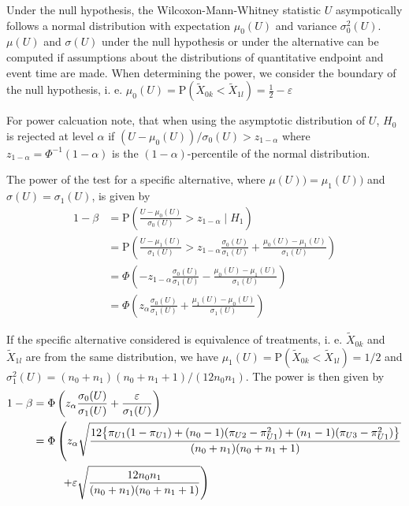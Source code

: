 \documentclass[bimj,fleqn]{w-art}\usepackage[]{graphicx}\usepackage[]{color}
\theoremstyle{plain}
\theoremstyle{definition}
\begin{document}
  Under the null hypothesis, the Wilcoxon-Mann-Whitney statistic $U$
  asympotically follows a normal distribution with expectation $\mu_0(U)$ and
  variance $\sigma^2_0(U)$. $\mu(U)$ and $\sigma(U)$ under the null hypothesis
  or under the alternative can be computed if assumptions about the
  distributions of quantitative endpoint and event time are made. When
  determining the power, we consider the boundary of the null hypothesis, i. e.
  $\mu_0(U) = \text{P}(\widetilde{X}_{0k} < \widetilde{X}_{1l})
          = \frac{1}{2} - \varepsilon$

  For power calcuation note, that when using the asymptotic distribution of $U$, $H_0$ is rejected at
  level $\alpha$ if $(U - \mu_0(U)) / \sigma_0(U) > z_{1 - \alpha}$ where
  $z_{1-\alpha} = \Phi^{-1}({1-\alpha})$ is the $(1 - \alpha)$-percentile of the
  normal distribution.

  The power of the test for a specific alternative, where $\mu(U)) = \mu_1(U))$
  and $\sigma(U) = \sigma_1(U)$, is given by
  \begin{align*}
    1 - \beta &= \text{P} \left(\frac{U - \mu_0(U)}{\sigma_0(U)}  >
                                   z_{1-\alpha} \mid H_1 \right) \\
              &= \text{P} \left(\frac{U - \mu_1(U)}{\sigma_1(U)}  >
                                   z_{1-\alpha}\frac{\sigma_0(U)}{\sigma_1(U)} +
                                   \frac{\mu_0(U) - \mu_1(U)}{\sigma_1(U)} \right) \\
              &= \Phi\left(- z_{1-\alpha}\frac{\sigma_0(U)}{\sigma_1(U)} -
                              \frac{\mu_0(U) - \mu_1(U)}{\sigma_1(U)} \right) \\
              &= \Phi\left(z_{\alpha}\frac{\sigma_0(U)}{\sigma_1(U)} +
                              \frac{\mu_1(U) - \mu_0(U)}{\sigma_1(U)} \right)
  \end{align*}

  If the specific alternative considered is equivalence of treatments, i. e.
  $\widetilde{X}_{0k}$ and $\widetilde{X}_{1l}$ are from the same distribution,
  we have $\mu_1(U) = \text{P}(\widetilde{X}_{0k} < \widetilde{X}_{1l}) = 1/2$
  and $\sigma^2_1(U) = (n_0 + n_1)(n_0 + n_1 +1) /(12 n_0 n_1)$. The power is
  then given by
  \begin{align*}
  1 - \beta &= \Phi\left(z_{\alpha}\frac{\sigma_0(U)}{\sigma_1(U)} +
                              \frac{\varepsilon}{\sigma_1(U)} \right) \\
            &= \Phi\left(z_{\alpha} \sqrt{\frac{12 \big\{ \pi_{U1} (1 - \pi_{U1}) +
                                    (n_0 - 1) (\pi_{U2} - \pi_{U1}^2) +
                                    (n_1 - 1) (\pi_{U3} - \pi_{U1}^2) \big\}}{(n_0 + n_1)(n_0 + n_1 +1)}} \right.\\
            &{\hphantom{= \Phi\bigg(}} \left. + \varepsilon \sqrt{\frac{12 n_0 n_1 }{(n_0 + n_1)(n_0 + n_1 +1)}} \right)
  \end{align*}
\end{document}
